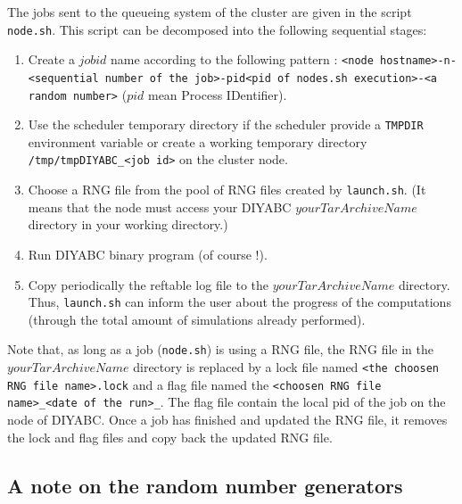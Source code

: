 \label{sub:node.sh} The jobs sent to the queueing system of the cluster
are given in the script \texttt{node.sh}. This script can be decomposed
into the following sequential stages:
\begin{enumerate}
\item Create a $jobid$ name according to the following pattern : \texttt{<node
hostname>-n-<sequential number of the job>-pid<pid of nodes.sh execution>-<a
random number>} ($pid$ mean Process IDentifier).
\item Use the scheduler temporary directory if the scheduler provide a \texttt{TMPDIR}
environment variable or create a working temporary directory \texttt{/tmp/tmpDIYABC\_<job
id>} on the cluster node.
\item Choose a RNG file from the pool of RNG files created by \texttt{launch.sh}.
(It means that the node must access your DIYABC $yourTarArchiveName$
directory in your working directory.)
\item Run DIYABC binary program (of course !).
\item Copy periodically the reftable log file to the $yourTarArchiveName$
directory. Thus, \texttt{launch.sh} can inform the user about the
progress of the computations (through the total amount of simulations
already performed).
\end{enumerate}
Note that, as long as a job (\texttt{node.sh}) is using a RNG file,
the RNG file in the $yourTarArchiveName$ directory is replaced by
a lock file named \texttt{<the choosen RNG file name>.lock} and a
flag file named the \texttt{<choosen RNG file name>\_<date of the
run>\_<job id>}. The flag file contain the local pid of the job on
the node of DIYABC. Once a job has finished and updated the RNG file,
it removes the lock and flag files and copy back the updated RNG file.




\subsection{A note on the random number generators}

\label{rng} 

